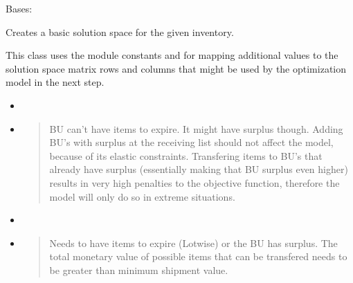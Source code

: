 \documentclass[letterpaper,10pt,english]{sphinxmanual}
\begin{document}
\begin{fulllineitems}
\label{\detokenize{source/optimization:optimization.solspace.SolutionSpace}}
Bases: 

Creates a basic solution space for the given inventory.

This class uses the module constants  and 
for mapping additional values to the solution space matrix rows and columns
that might be used by the optimization model in the next step.

\begin{itemize}
\item {} 
 

\item {} 
\begin{quote}

BU can’t have items to expire. It might have surplus though.
Adding BU’s with surplus at the receiving list should
not affect the model, because of its elastic constraints. Transfering
items to BU’s that already have surplus (essentially making that BU surplus even higher)
results in very high penalties to the objective function, therefore the model will only
do so in extreme situations.
\end{quote}

\end{itemize}

\begin{itemize}
\item {} 
 

\item {} 
\begin{quote}

Needs to have items to expire (Lot\sphinxhyphen{}wise) or the BU has surplus.
The total monetary value of possible items that can be transfered
needs to be greater than minimum shipment value.
\end{quote}


\end{itemize}
\end{fulllineitems}
\end{document}
